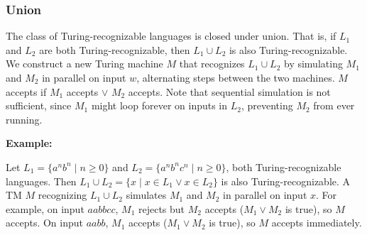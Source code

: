 \documentclass[12pt,a4paper,openany]{article}
\begin{document}
\begin{center}
\end{center}

\subsubsection{Union}

The class of Turing-recognizable languages is closed under union. That is, if $L_1$ and $L_2$ are both Turing-recognizable, then $L_1 \cup L_2$ is also Turing-recognizable. 
We construct a new Turing machine $M$ that recognizes $L_1 \cup L_2$ by simulating $M_1$ and $M_2$ in parallel on input $w$, alternating steps between the two machines. 
$M$ accepts if $M_1$ accepts $\lor$ $M_2$ accepts. Note that sequential simulation is not sufficient, since $M_1$ might loop forever on inputs in $L_2$, preventing $M_2$ from ever running.

\textbf{Example:}

Let $L_1 = \{a^n b^n \mid n \geq 0\}$ and $L_2 = \{a^n b^n c^n \mid n \geq 0\}$, both Turing-recognizable languages. Then $L_1 \cup L_2 = \{x \mid x \in L_1 \lor x \in L_2\}$ is also Turing-recognizable. A TM $M$ recognizing $L_1 \cup L_2$ simulates $M_1$ and $M_2$ in parallel on input $x$. For example, on input $aabbcc$, $M_1$ rejects but $M_2$ accepts ($M_1 \lor M_2$ is true), so $M$ accepts. On input $aabb$, $M_1$ accepts ($M_1 \lor M_2$ is true), so $M$ accepts immediately.
\end{document}
